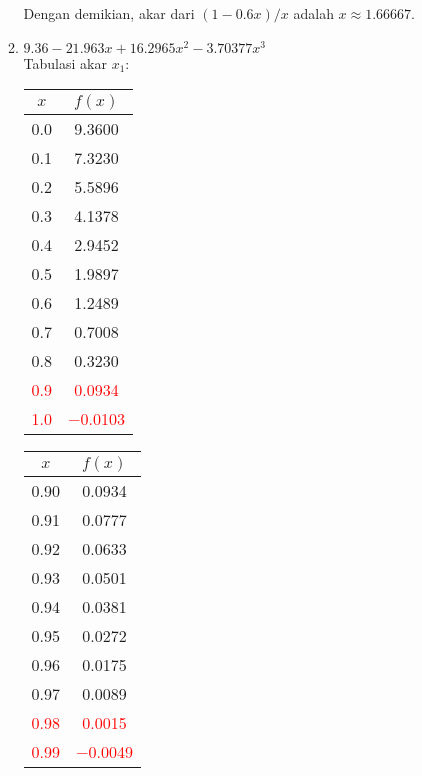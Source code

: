 \documentclass{article}
\begin{document}
\begin{enumerate}
\begin{enumerate}
        Dengan demikian, akar dari $(1 - \num{0,6}x) / x$ adalah $x \approx \num{1,66667}$.
    
        \item $\num{9,36} - \num{21,963}x + \num{16,2965}x^2 - \num{3,70377}x^3$ \\
        Tabulasi akar $x_1$: \\
        \begin{tabular}{|c|c|}
            \hline
            $x$   & $f(x)$ \\
            \hline
            \num{0,0} & \num{9,3600} \\
            \num{0,1} & \num{7,3230} \\
            \num{0,2} & \num{5,5896} \\
            \num{0,3} & \num{4,1378} \\
            \num{0,4} & \num{2,9452} \\
            \num{0,5} & \num{1,9897} \\
            \num{0,6} & \num{1,2489} \\
            \num{0,7} & \num{0,7008} \\
            \num{0,8} & \num{0,3230} \\
            \textcolor{red}{\num{0,9}} & \textcolor{red}{\num{0,0934}} \\
            \textcolor{red}{\num{1,0}} & \textcolor{red}{\num{-0,0103}} \\
            \hline
            \end{tabular}\quad
            \begin{tabular}{|c|c|}
            \hline
            $x$   & $f(x)$ \\
            \hline
            \num{0,90} & \num{0,0934} \\
            \num{0,91} & \num{0,0777} \\
            \num{0,92} & \num{0,0633} \\
            \num{0,93} & \num{0,0501} \\
            \num{0,94} & \num{0,0381} \\
            \num{0,95} & \num{0,0272} \\
            \num{0,96} & \num{0,0175} \\
            \num{0,97} & \num{0,0089} \\
            \textcolor{red}{\num{0,98}} & \textcolor{red}{\num{0,0015}} \\
            \textcolor{red}{\num{0,99}} & \textcolor{red}{\num{-0,0049}} \\

\end{tabular}
\end{enumerate}
\end{enumerate}
\end{document}
